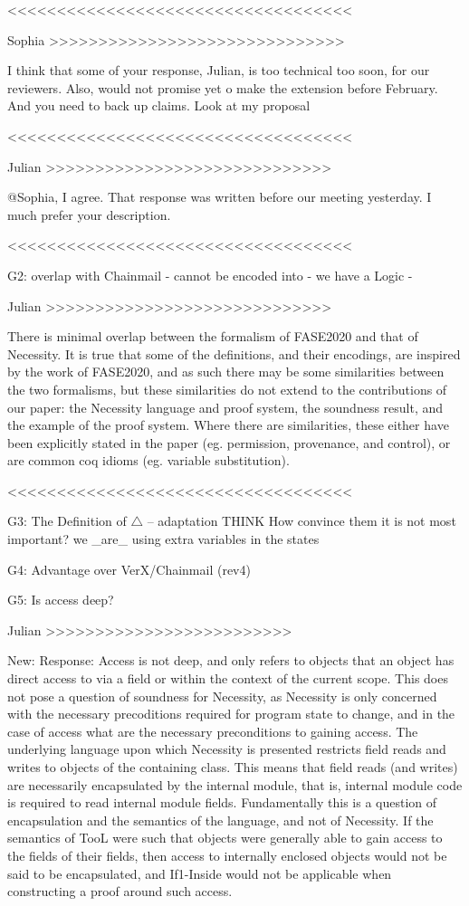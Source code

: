 <<<<<<<<<<<<<<<<<<<<<<<<<<<<<<<<<<<

Sophia >>>>>>>>>>>>>>>>>>>>>>>>>>>>>>

I think that some of your response, Julian, is too technical too soon, for our reviewers. Also, would not promise yet o make the extension before February. And you need to back up claims. Look at my proposal

<<<<<<<<<<<<<<<<<<<<<<<<<<<<<<<<<<<

Julian >>>>>>>>>>>>>>>>>>>>>>>>>>>>>

@Sophia, I agree. That response was written before our meeting yesterday. I much prefer your description.

<<<<<<<<<<<<<<<<<<<<<<<<<<<<<<<<<<<

G2:  overlap with Chainmail
- cannot be encoded into
- we have a Logic
- %

Julian >>>>>>>>>>>>>>>>>>>>>>>>>>>>>

There is minimal overlap between the formalism of FASE2020 and that of Necessity. It is true that some of the definitions, and their encodings, are inspired by the work of FASE2020, 
and as such there may be some similarities between the two formalisms, but these similarities do not extend to the contributions of our paper: the Necessity language and proof system, 
the soundness result, and the example of the proof system. Where there are similarities, these either have been explicitly stated in the paper (eg. permission, provenance, and control),
or are common coq idioms (eg. variable substitution).

<<<<<<<<<<<<<<<<<<<<<<<<<<<<<<<<<<<

G3: The Definition of $\triangle$ -- adaptation
THINK
How convince them it is not most important?
we _are_ using extra variables in the states

G4: Advantage over VerX/Chainmail (rev4)

G5: Is access deep?

Julian >>>>>>>>>>>>>>>>>>>>>>>>>

New:
Response: 
Access is not deep, and only refers to objects that an object has direct access to via a field or within the context of the current scope. This does not pose a question of soundness for
Necessity, as Necessity is only concerned with the necessary precoditions required for program state to change, and in the case of access what are the necessary preconditions to 
gaining access. The underlying language upon which Necessity is presented restricts field reads and writes to objects of the containing class. This means that field reads (and writes) 
are necessarily encapsulated by the internal module, that is, internal module code is required to read internal module fields. Fundamentally this is a question of encapsulation and the 
semantics of the language, and not of Necessity. If the semantics of TooL were such that objects were generally able to gain access to the fields of their fields, then access to internally 
enclosed objects would not be said to be encapsulated, and If1-Inside would not be applicable when constructing a proof around such access.


